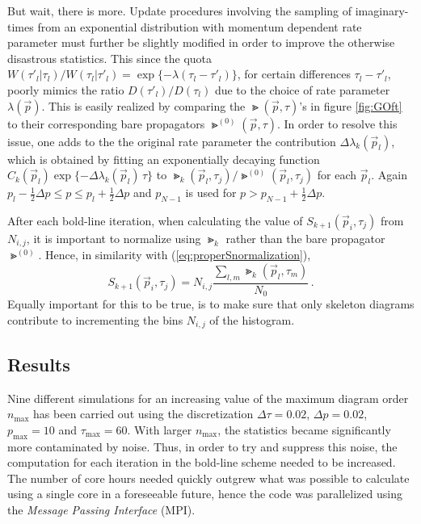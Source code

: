 But wait, there is more. Update procedures involving the sampling of imaginary-times from an exponential distribution with momentum dependent rate parameter must further be slightly modified in order to improve the otherwise disastrous statistics. This since the quota $ W(\tau'_l | \tau_l) / W(\tau_l | \tau'_l) = \exp \{ -\lambda (\tau_l - \tau'_l) \}$, for certain differences $ \tau_l - \tau'_l $, poorly mimics the ratio $ D(\tau'_l) / D(\tau_l) $ due to the choice of rate parameter $ \lambda(\vec p) $. This is easily realized by comparing the $ \Gt(\vec p, \tau) $'s in figure \ref{fig:GOft} to their corresponding bare propagators $ \Gt^{(0)}(\vec p, \tau) $. In order to resolve this issue, one adds to the the original rate parameter the contribution $ \Delta \lambda_k(\vec p_l) $, which is obtained by fitting an exponentially decaying function $ C_k(\vec p_l)  \exp \{ - \Delta \lambda_k(\vec p_l) \, \tau \} $ to $ \Gt_k(\vec p_l, \tau_j) / \Gt^{(0)} (\vec p_l, \tau_j) $ for each $ \vec p_l $. Again $ p_l - \tfrac{1}{2} \Delta p \leq p \leq p_l + \tfrac{1}{2} \Delta p $ and $ p_{N-1} $ is used for $ p > p_{N-1} + \tfrac{1}{2} \Delta p $.

After each bold-line iteration, when calculating the value of $ S_{k+1}(\vec p_i, \tau_j) $ from $ N_{i,j} $, it is important to normalize using $ \Gt_k $ rather than the bare propagator $ \Gt^{(0)} $. Hence, in similarity with (\ref{eq:properSnormalization}),
\begin{equation}
	S_{k+1} (\vec p_i, \tau_j) = N_{i,j} \frac{\sum_{l,m} \Gt_k (\vec p_l, \tau_m)}{N_0} \,.
\end{equation}
Equally important for this to be true, is to make sure that only skeleton diagrams contribute to incrementing the bins $ N_{i,j} $ of the histogram.


\subsection{Results}

Nine different simulations for an increasing value of the maximum diagram order $ n_\text{max} $ has been carried out using the discretization $ \Delta \tau = 0.02 $, $ \Delta p = 0.02 $, $ p_\text{max} = 10 $ and $ \tau_\text{max} = 60 $. With larger $ n_\text{max} $, the statistics became significantly more contaminated by noise. Thus, in order to try and suppress this noise, the computation for each iteration in the bold-line scheme needed to be increased. The number of core hours needed quickly outgrew what was possible to calculate using a single core in a foreseeable future, hence the code was parallelized using the \textit{Message Passing Interface} (MPI).

